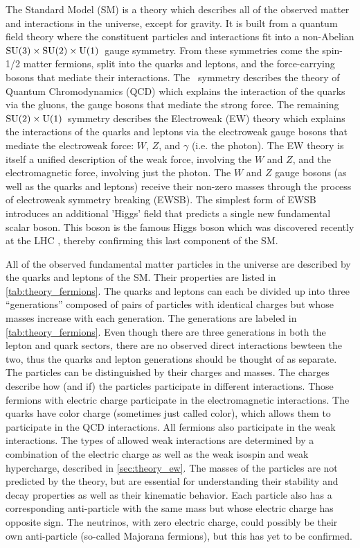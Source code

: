 The Standard Model (SM) is a theory which describes all of the
observed matter and interactions in the universe, except for gravity.
It is built from a quantum field theory where the constituent particles
and interactions fit into a non-Abelian 
$\textrm{SU(3)}\times\textrm{SU(2)}\times\textrm{U(1)}$~gauge symmetry.
From these symmetries come the spin-1/2 matter fermions, split 
into the quarks and leptons, and the force-carrying bosons
that mediate their interactions.
The \suthree~symmetry describes the theory of Quantum Chromodynamics (QCD)
which explains the interaction of the quarks via the gluons, the
gauge bosons that mediate the strong force.
The remaining $\textrm{SU(2)}\times\textrm{U(1)}$~symmetry 
describes the Electroweak (EW) theory which explains
the interactions of the quarks and leptons via the 
electroweak gauge bosons that mediate
the electroweak force: $W$, $Z$, and $\gamma$ (i.e. the photon).
The EW theory is itself a unified description of the weak force,
involving the $W$ and $Z$, and the electromagnetic force, involving
just the photon.
The $W$ and $Z$ gauge bosons (as well as the quarks and leptons) receive
their non-zero masses through the process of electroweak symmetry
breaking (EWSB). The simplest form of EWSB
introduces an additional 'Higgs' field that
predicts a single new fundamental scalar boson. This boson is the
famous Higgs boson which was discovered recently at the 
LHC \cite{Aad20121,Chatrchyan:2012xdj}, thereby
confirming this last component of the SM.

All of the 
observed fundamental 
matter particles in the universe are described by the quarks
and leptons of the SM. Their properties are listed 
in \tab\ref{tab:theory_fermions}. 
The quarks and leptons can each be divided up into three ``generations'' 
composed of pairs
of particles with identical charges but whose masses increase with each generation.
The generations are labeled in \tab\ref{tab:theory_fermions}. 
Even though there are three 
generations in both the lepton and quark sectors, 
there are no observed direct interactions bewteen the two, 
thus the quarks and lepton generations should be thought of as separate.
The particles can be distinguished
by their charges and masses.
The charges describe how (and if) the particles participate in
different interactions.
Those fermions with electric charge 
participate in the electromagnetic
interactions. The quarks have color charge (sometimes 
just called color), which allows them to 
participate in the QCD interactions. All fermions also participate in 
the weak interactions. The types of allowed weak interactions are determined
by a combination of the electric charge as well as the weak isospin
and weak hypercharge, described in \sec\ref{sec:theory_ew}.
The masses of the particles are not predicted by the theory, but 
are essential for understanding their stability and decay properties
as well as their kinematic behavior.
Each particle also has a corresponding anti-particle with the same mass but
whose electric charge has opposite sign. The neutrinos, with zero 
electric charge, could possibly be their own 
anti-particle (so-called Majorana fermions), but
this has yet to be confirmed.


